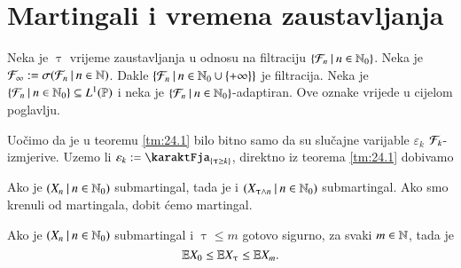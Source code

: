 
\chapter{Martingali i vremena zaustavljanja}

Neka je $\uptau$ vrijeme zaustavljanja u odnosu na filtraciju $\{{\mathcal{F}_n} \: | \: {n \in \mathbb{N}_0}\}$.
Neka je $\mathcal{F}_\infty := \sigma({\mathcal{F}_n} \: | \: {n \in \mathbb{N}})$.
Dakle $\{{\mathcal{F}_n} \: | \: {n \in \mathbb{N}_0 \cup \{+\infty\}}\}$ je filtracija.
Neka je $\{{\mathcal{F}_n} \: | \: {n \in \mathbb{N}_0 }\} \subseteq L^1 (\mathbb{P})$ i neka je $\{{\mathcal{F}_n} \: | \: {n \in \mathbb{N}_0}\}$-adaptiran.
Ove oznake vrijede u cijelom poglavlju.

Uo\v cimo da je u teoremu \ref{tm:24.1} bilo bitno samo da su slu\v cajne varijable $\varepsilon_k$ $\mathcal{F}_k$-izmjerive.
Uzemo li $\varepsilon_k := \karaktFja_{\{\uptau \geq k\}}$, direktno iz teorema \ref{tm:24.1} dobivamo

\begin{tm}  \label{tm:25.1}
    Ako je $({X_n} \: | \: {n \in \mathbb{N}_0})$ submartingal, tada je i $({X_{\uptau \land n}} \: | \: {n \in \mathbb{N}_0})$ submartingal.
    Ako smo krenuli od martingala, dobit \' cemo martingal.
\end{tm}

\begin{kor} \label{kor:25.2}
    Ako je $({X_n} \: | \: {n \in \mathbb{N}_0})$ submartingal i $\uptau \leq m$ gotovo sigurno, za svaki $m \in \mathbb{N}$, tada je
    \begin{equation*}
        \mathbb{E} X_0 \leq \mathbb{E} X_\uptau \leq \mathbb{E} X_m.
    \end{equation*}
\end{kor}
